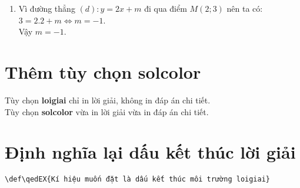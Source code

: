 \documentclass[12pt,a4paper,oneside]{article}
\begin{document}
\begin{ex}
{\begin{enumerate}
\begin{center}
        		\end{center}        		
        \item Vì đường thẳng $(d):y = 2x + m$  đi qua điểm  $M(2;3)$ nên ta có: $3=2.2+m \Leftrightarrow m=-1$.\\
        		Vậy $m=-1$.
    \end{enumerate}
    }
\end{ex}
\section{Thêm tùy chọn solcolor}
Tùy chọn \textbf{loigiai} chỉ in lời giải, không in đáp án chi tiết.\\
Tùy chọn \textbf{solcolor} vừa in lời giải vừa in đáp án chi tiết.
\section{Định nghĩa lại dấu kết thúc lời giải}
\begin{verbatim}
\def\qedEX{Kí hiệu muốn đặt là dấu kết thúc môi trường loigiai}
\end{verbatim}
\def\qedEX{\color{blue}\ensuremath{\square}}
\end{document}
